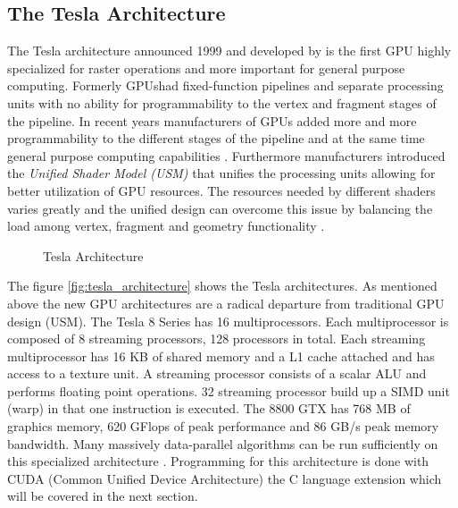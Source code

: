 \subsection*{The Tesla Architecture} %
\label{sub:the_tesla_architecture}
The Tesla architecture announced 1999 and developed by {} is the first
GPU highly specialized for raster operations and more important
for general purpose computing. Formerly \glspl{GPU}had fixed-function
pipelines and separate processing units with no ability for programmability to
the vertex and fragment stages of the pipeline. In recent years manufacturers of
GPUs added more and more programmability to the different stages
of the pipeline and at the same time general purpose computing capabilities
\citep{citeulike:3844545}. Furthermore manufacturers introduced the \emph{Unified
Shader Model (USM)} that unifies the processing units allowing for better
utilization of \gls{GPU} resources. The resources needed by different
shaders varies greatly and the unified design can overcome this issue by
balancing the load among vertex, fragment and geometry functionality
\citep{citeulike:3145468}.

\begin{figure}[ht]
\centering
\caption{Tesla Architecture}
\label{fig:tesla_architecture}
\end{figure}

The figure \autoref{fig:tesla_architecture} shows the Tesla architectures. As
mentioned above the new \gls{GPU} architectures are a radical departure
from traditional \gls{GPU} design (USM). The Tesla 8 Series has 16 multiprocessors. 
Each multiprocessor is composed of 8 streaming processors, 128 processors in 
total. Each streaming multiprocessor has 16 KB of shared memory
and a L1 cache attached and has access to a texture unit. A streaming processor
consists of a scalar ALU and performs floating point operations. 32 streaming
processor build up a SIMD unit (warp) in that one instruction is executed.
The 8800 GTX has 768 MB of graphics memory, 620 GFlops of peak performance and
86 GB/s peak memory bandwidth. Many massively data-parallel algorithms can be
run sufficiently on this specialized architecture \citep{citeulike:3145468}.
Programming for this architecture is done with \gls{CUDA} (Common Unified Device
Architecture) the C language extension which will be covered in the next
section.


